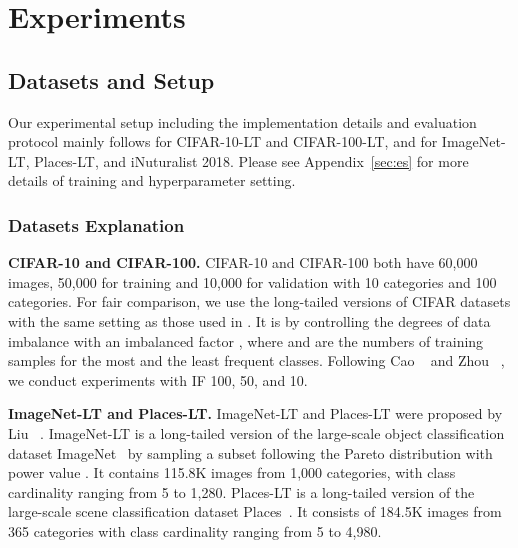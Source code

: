\documentclass[final]{cvpr}
\begin{document}
	\section{Experiments}
	
	\vspace{1pt}
	
	\subsection{Datasets and Setup}
	
	Our experimental setup including the implementation details and evaluation protocol mainly follows \cite{ldam} for CIFAR-10-LT and CIFAR-100-LT, and \cite{decouple} for ImageNet-LT, Places-LT, and iNuturalist 2018. Please see Appendix~\ref{sec:es} for more details of training and hyperparameter setting.
	
	\vspace{-2pt}
	\subsubsection{Datasets Explanation} 
	\vspace{1pt}
	
	\noindent\textbf{CIFAR-10 and CIFAR-100.} \quad CIFAR-10 and CIFAR-100 both have 60,000 images, 50,000 for training and 10,000 for validation with 10 categories and 100 categories. For fair comparison, we use the long-tailed versions of CIFAR datasets with the same setting as those used in \cite{ldam}. It is by controlling the degrees of data imbalance with an imbalanced factor , where  and  are the numbers of training samples for the most and the least frequent classes. Following Cao \etal~\cite{ldam} and Zhou \etal~\cite{bbn}, we conduct experiments with IF 100, 50, and 10. 
	 
	\vspace{5pt}
	
	\noindent\textbf{ImageNet-LT and Places-LT.} \quad ImageNet-LT and Places-LT were proposed by Liu \etal~\cite{liu2019large}. ImageNet-LT is a long-tailed version of the large-scale object classification dataset ImageNet~\cite{imagenet} by sampling a subset following the Pareto distribution with power value . It contains 115.8K images from 1,000 categories, with class cardinality ranging from 5 to 1,280. Places-LT is a long-tailed version of the large-scale scene classification dataset Places~\cite{places}. It consists of 184.5K images from 365 categories with class cardinality ranging from 5 to 4,980. 
	
\end{document}
